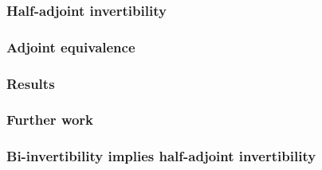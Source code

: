 \documentclass[presentation]{beamer}
\begin{document}
\begin{frame}
  \frametitle{Half-adjoint invertibility}
\end{frame}

\begin{frame}
  \frametitle{Adjoint equivalence}
\end{frame}

\begin{frame}
  \frametitle{Results}

\end{frame}

\begin{frame}
  \frametitle{Further work}
\end{frame}

\begin{frame}
  \frametitle{Bi-invertibility implies half-adjoint invertibility}
\end{frame}
\end{document}

